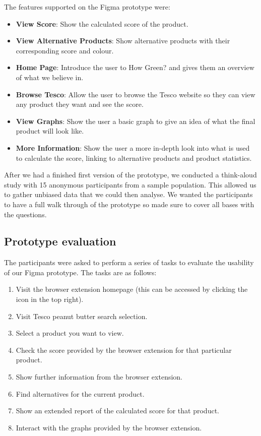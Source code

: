 \documentclass[a4,10pt,twocolumn]{article}
\begin{document}
The features supported on the Figma prototype were:
\begin{itemize}
    \item \textbf{View Score}: Show the calculated score of the product.
    \item\textbf{View Alternative Products}: Show alternative products with their corresponding score and colour.
    \item\textbf{Home Page}: Introduce the user to How Green? and gives them an overview of what we believe in.
    \item\textbf{Browse Tesco}: Allow the user to browse the Tesco website so they can view any product they want and see the score.
    \item\textbf{View Graphs}: Show the user a basic graph to give an idea of what the final product will look like.
    \item\textbf{More Information}: Show the user a more in-depth look into what is used to calculate the score, linking to alternative products and product statistics.
\end{itemize}

After we had a finished first version of the prototype, we conducted a think-aloud study with 15 anonymous participants from a sample population. This allowed us to gather unbiased data that we could then analyse. We wanted the participants to have a full walk through of the prototype so made sure to cover all bases with the questions.     

\subsection*{Prototype evaluation}
The participants were asked to perform a series of tasks to evaluate the usability of our Figma prototype. The tasks are as follows:

\begin{enumerate}
    \item Visit the browser extension homepage (this can be accessed by clicking the icon in the top right).
    \item Visit Tesco peanut butter search selection.
    \item Select a product you want to view.
    \item Check the score provided by the browser extension for that particular product. 
    \item Show further information from the browser extension.
    \item Find alternatives for the current product.
    \item Show an extended report of the calculated score for that product.
    \item Interact with the graphs provided by the browser extension.
\end{enumerate}
\end{document}
